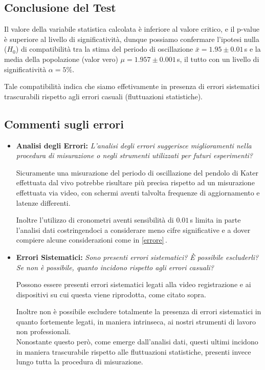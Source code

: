 \documentclass{article}
\begin{document}
\subsection{Conclusione del Test}
Il valore della variabile statistica calcolata è inferiore al valore critico, e il p-value è superiore al livello di significatività, dunque possiamo confermare l'ipotesi nulla ($H_0$) di compatibilità tra la stima del periodo di oscillazione $\bar{x} = 1.95 \pm 0.01\,$s e la media della popolazione (valor vero) $\mu = 1.957 \pm 0.001\,$s, il tutto con un livello di significatività $\alpha = 5\%$.

Tale compatibilità indica che siamo effetivamente in presenza di errori sistematici trascurabili rispetto agli errori casuali (fluttuazioni statistiche).

\subsection{Commenti sugli errori}
\label{sei}
\begin{itemize}
    \item \textbf{Analisi degli Errori:} \textit{L'analisi degli errori suggerisce miglioramenti nella procedura di misurazione o negli strumenti utilizzati per futuri esperimenti?}
    
    Sicuramente una misurazione del periodo di oscillazione del pendolo di Kater effettuata dal vivo potrebbe risultare più precisa rispetto ad un misurazione effettuata via video, con schermi aventi talvolta frequenze di aggiornamento e latenze differenti.
    
    Inoltre l'utilizzo di cronometri aventi sensibilità di $0.01\,$s limita in parte l'analisi dati costringendoci a considerare meno cifre significative e a dover compiere alcune considerazioni come in \ref{errore}$\,$. 
    
    \item \textbf{Errori Sistematici:} \textit{Sono presenti errori sistematici? È possibile escluderli? Se non è possibile, quanto incidono rispetto agli errori casuali?}

    Possono essere presenti errori sistematici legati alla video registrazione e ai dispositivi su cui questa viene riprodotta, come citato sopra.
    
    Inoltre non è possibile escludere totalmente la presenza di errori sistematici in quanto fortemente legati, in maniera intrinseca, ai nostri strumenti di lavoro non professionali.
    \\Nonostante questo però, come emerge dall'analisi dati, questi ultimi incidono in maniera trascurabile rispetto alle fluttuazioni statistiche, presenti invece lungo tutta la procedura di misurazione.
    
\end{itemize}
\end{document}

